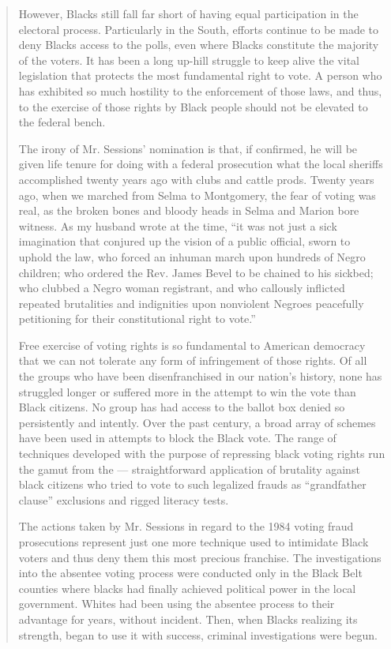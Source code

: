 \begin{quote}
However, Blacks still fall far short of having equal participation in
the electoral process. Particularly in the South, efforts continue to be
made to deny Blacks access to the polls, even where Blacks constitute
the majority of the voters. It has been a long up-hill struggle to keep
alive the vital legislation that protects the most fundamental right to
vote. A person who has exhibited so much hostility to the enforcement of
those laws, and thus, to the exercise of those rights by Black people
should not be elevated to the federal bench.

The irony of Mr. Sessions' nomination is that, if confirmed, he will be
given life tenure for doing with a federal prosecution what the local
sheriffs accomplished twenty years ago with clubs and cattle prods.
Twenty years ago, when we marched from Selma to Montgomery, the fear of
voting was real, as the broken bones and bloody heads in Selma and
Marion bore witness. As my husband wrote at the time, ``it was not just
a sick imagination that conjured up the vision of a public official,
sworn to uphold the law, who forced an inhuman march upon hundreds of
Negro children; who ordered the Rev. James Bevel to be chained to his
sickbed; who clubbed a Negro woman registrant, and who callously
inflicted repeated brutalities and indignities upon nonviolent Negroes
peacefully petitioning for their constitutional right to vote.''

Free exercise of voting rights is so fundamental to American democracy
that we can not tolerate any form of infringement of those rights. Of
all the groups who have been disenfranchised in our nation's history,
none has struggled longer or suffered more in the attempt to win the
vote than Black citizens. No group has had access to the ballot box
denied so persistently and intently. Over the past century, a broad
array of schemes have been used in attempts to block the Black vote. The
range of techniques developed with the purpose of repressing black
voting rights run the gamut from the --- straightforward application of
brutality against black citizens who tried to vote to such legalized
frauds as ``grandfather clause'' exclusions and rigged literacy tests.

The actions taken by Mr. Sessions in regard to the 1984 voting fraud
prosecutions represent just one more technique used to intimidate Black
voters and thus deny them this most precious franchise. The
investigations into the absentee voting process were conducted only in
the Black Belt counties where blacks had finally achieved political
power in the local government. Whites had been using the absentee
process to their advantage for years, without incident. Then, when
Blacks realizing its strength, began to use it with success, criminal
investigations were begun.


\end{quote}
